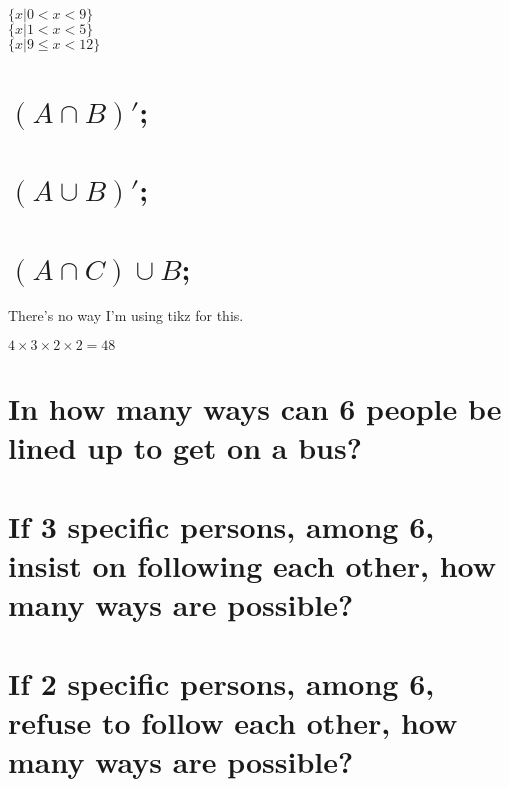 \documentclass[answers]{exam}
\begin{document}
\begin{questions}
\begin{solution}
	\\$\{x|0 < x < 9\}$ \\
	$\{x|1 < x < 5\}$ \\
	$\{x| 9 \leq x < 12\}$
\end{solution}


\begin{parts}
	\part{$(A \cap B)'$;}
	\part{$(A \cup B)'$;}
	\part{$(A \cap C) \cup B$;}
\end{parts}

\begin{solution}
	There's no way I'm using tikz for this.
\end{solution}


\begin{solution}
	$4 \times 3 \times 2 \times 2 = 48$
\end{solution}

\question{}

\begin{parts}
	\part{In how many ways can 6 people be lined up to get on a bus?}
	\part{If 3 specific persons, among 6, insist on following each other, how many ways are possible?}
	\part{If 2 specific persons, among 6, refuse to follow each other, how many ways are possible?}
\end{parts}


\end{questions}
\end{document}
